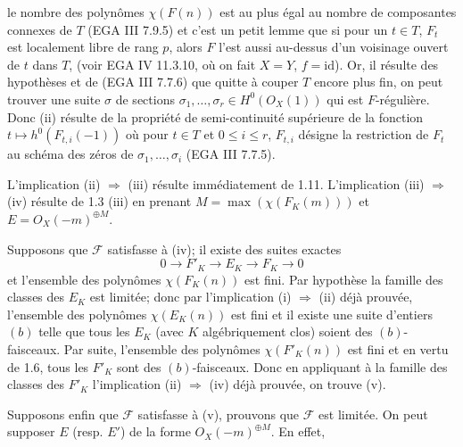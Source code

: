
le nombre des polynômes \(\chi(F(n))\) est au plus égal au nombre de composantes connexes de \(T\) (EGA III 7.9.5) et c'est un petit lemme que si pour un \(t\in T\), \(F_t\) est localement libre de rang \(p\), alors \(F\) l'est aussi au-dessus d'un voisinage ouvert de \(t\) dans \(T\), (voir EGA IV 11.3.10, où on fait \(X=Y\), \(f=\mathrm{id}\)). Or, il résulte des hypothèses et de (EGA III 7.7.6) que quitte à couper \(T\) encore plus fin, on peut trouver une suite \(\sigma\) de sections \(\sigma_1,\ldots,\sigma_r\in H^0({O}_X(1))\) qui est \(F\)-régulière. Donc (ii) résulte de la propriété de semi-continuité supérieure de la fonction \(t\longmapsto h^0(F_{t,i}(-1))\) où pour \(t\in T\) et \(0\le i\le r\), \(F_{t,i}\) désigne la restriction de \(F_t\) au schéma des zéros de \(\sigma_1,\ldots,\sigma_i\) (EGA III 7.7.5).

L'implication (ii) \(\Rightarrow\) (iii) résulte immédiatement de 1.11. L'implication (iii) \(\Rightarrow\) (iv) résulte de 1.3 (iii) en prenant \(M=\max(\chi(F_K(m)))\) et \(E={O}_X(-m)^{\oplus M}\).

Supposons que \(\mathcal F\) satisfasse à (iv); il existe des suites exactes
\[
0\longrightarrow F'_K\longrightarrow E_K\longrightarrow F_K\longrightarrow0
\]
et l'ensemble des polynômes \(\chi(F_K(n))\) est fini. Par hypothèse la famille des classes des \(E_K\) est limitée; donc par l'implication (i) \(\Rightarrow\) (ii) déjà prouvée, l'ensemble des polynômes \(\chi(E_K(n))\) est fini et il existe une suite d'entiers \((b)\) telle que tous les \(E_K\) (avec \(K\) algébriquement clos) soient des \((b)\)-faisceaux. Par suite, l'ensemble des polynômes \(\chi(F'_K(n))\) est fini et en vertu de 1.6, tous les \(F'_K\) sont des \((b)\)-faisceaux. Donc en appliquant à la famille des classes des \(F'_K\) l'implication (ii) \(\Rightarrow\) (iv) déjà prouvée, on trouve (v).

Supposons enfin que \(\mathcal F\) satisfasse à (v), prouvons que \(\mathcal F\) est limitée. On peut supposer \(E\) (resp. \(E'\)) de la forme \({O}_X(-m)^{\oplus M}\). En effet,

